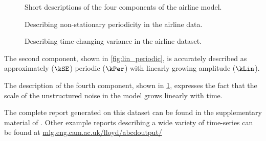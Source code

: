\begin{figure}[ht!]
\centering
{}
\caption[Short descriptions of the four components of the airline model]
{Short descriptions of the four components of the airline model.}
\label{fig:exec-airline}
%
\centering
{}
\caption[Describing non-stationary periodicity in the airline data]
{Describing non-stationary periodicity in the airline data.}
\label{fig:lin_periodic}
%
\centering
{}
\caption[Describing time-changing variance in the airline dataset]
{Describing time-changing variance in the airline dataset.}
\label{fig:heteroscedastic}
\end{figure}

The second component, shown in \cref{fig:lin_periodic}, is accurately described as approximately ($\kSE$) periodic ($\kPer$) with linearly growing amplitude ($\kLin$).

The description of the fourth component, shown in \cref{fig:heteroscedastic}, expresses the fact that the scale of the unstructured noise in the model grows linearly with time.

The complete report generated on this dataset can be found in the supplementary material of \citet{LloDuvGroetal14}.
Other example reports describing a wide variety of time-series can be found at \url{mlg.eng.cam.ac.uk/lloyd/abcdoutput/}


